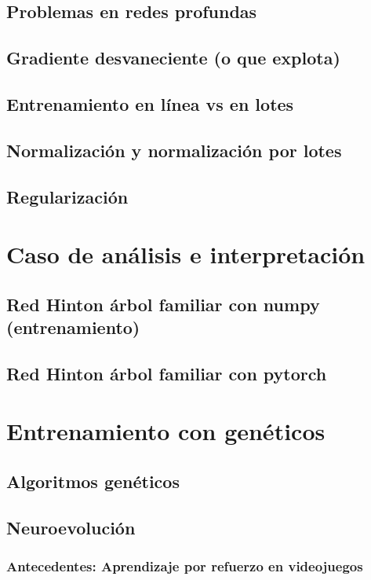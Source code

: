 \documentclass[12pt,openany]{book}
\begin{document}
\section{Problemas en redes profundas}
\section{Gradiente desvaneciente (o que explota) }
\section{Entrenamiento en línea vs en lotes}
\section{Normalización y normalización por lotes}
\section{Regularización}

\chapter{Caso de análisis e interpretación}

\section{Red Hinton árbol familiar con numpy (entrenamiento)}

\section{Red Hinton árbol familiar con pytorch}

\chapter{Entrenamiento con genéticos}
\section{Algoritmos genéticos}
\section{Neuroevolución}
\subsection{Antecedentes: Aprendizaje por refuerzo en videojuegos}
\end{document}
